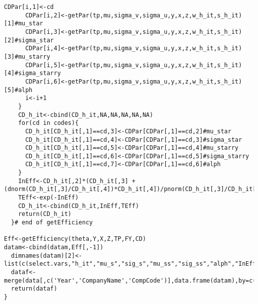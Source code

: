 \begin{lstlisting}[label=Rcode2, caption=R-Code for Efficiency and Fixed Effects Estimation]
      CDPar[i,1]<-cd
      CDPar[i,2]<-getPar(tp,mu,sigma_v,sigma_u,y,x,z,w_h_it,s_h_it)[1]#mu_star
      CDPar[i,3]<-getPar(tp,mu,sigma_v,sigma_u,y,x,z,w_h_it,s_h_it)[2]#sigma_star
      CDPar[i,4]<-getPar(tp,mu,sigma_v,sigma_u,y,x,z,w_h_it,s_h_it)[3]#mu_starry
      CDPar[i,5]<-getPar(tp,mu,sigma_v,sigma_u,y,x,z,w_h_it,s_h_it)[4]#sigma_starry
      CDPar[i,6]<-getPar(tp,mu,sigma_v,sigma_u,y,x,z,w_h_it,s_h_it)[5]#alph
      i<-i+1
    }
    CD_h_it<-cbind(CD_h_it,NA,NA,NA,NA,NA)
    for(cd in codes){
      CD_h_it[CD_h_it[,1]==cd,3]<-CDPar[CDPar[,1]==cd,2]#mu_star
      CD_h_it[CD_h_it[,1]==cd,4]<-CDPar[CDPar[,1]==cd,3]#sigma_star
      CD_h_it[CD_h_it[,1]==cd,5]<-CDPar[CDPar[,1]==cd,4]#mu_starry
      CD_h_it[CD_h_it[,1]==cd,6]<-CDPar[CDPar[,1]==cd,5]#sigma_starry
      CD_h_it[CD_h_it[,1]==cd,7]<-CDPar[CDPar[,1]==cd,6]#alph
    }
    InEff<-CD_h_it[,2]*(CD_h_it[,3] + (dnorm(CD_h_it[,3]/CD_h_it[,4])*CD_h_it[,4])/pnorm(CD_h_it[,3]/CD_h_it[,4]))
    TEff<-exp(-InEff)
    CD_h_it<-cbind(CD_h_it,InEff,TEff)      
    return(CD_h_it)    
  }# end of getEfficiency   
  
Eff<-getEfficiency(theta,Y,X,Z,TP,FY,CD) 
datam<-cbind(datam,Eff[,-1])
  dimnames(datam)[2]<-list(c(select.vars,"h_it","mu_s","sig_s","mu_ss","sig_ss","alph","InEff_u","TEff"))
  dataf<-merge(data[,c('Year','CompanyName','CompCode')],data.frame(datam),by=c('Year','CompCode'))
  return(dataf)  
}
\end{lstlisting}





